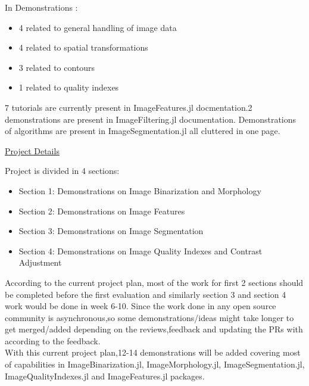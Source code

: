 In Demonstrations :
\begin{itemize}[noitemsep,topsep=0.2cm]
    \item 4 related to general handling of image data
    \item 4 related to spatial transformations
    \item 3 related to contours
    \item 1 related to quality indexes
\end{itemize}
7 tutorials are currently present in ImageFeatures.jl docmentation.2  demonstrations are present in ImageFiltering.jl documentation. Demonstrations of algorithms are present in ImageSegmentation.jl all cluttered in one page.


\vspace{0.5cm}
\Large
\underline{Project Details}

\vspace{0.5cm}
\large
Project is divided in 4 sections:
\begin{itemize}[noitemsep,topsep=0.2cm]
    \item Section 1: Demonstrations on Image Binarization and Morphology
    \item Section 2: Demonstrations on Image Features
    \item Section 3: Demonstrations on Image Segmentation
    \item Section 4: Demonstrations on Image Quality Indexes and Contrast Adjustment
\end{itemize}
According to the current project plan, most of the work for first 2 sections should be completed before the first evaluation and similarly section 3 and section 4 work would be done in week 6-10. Since the work done in any open source community is asynchronous,so some demonstrations/ideas might take longer to get merged/added depending on the reviews,feedback and updating the PRs with according to the feedback.\\
With this current project plan,12-14 demonstrations will be added covering most of capabilities in ImageBinarization.jl, ImageMorphology.jl, ImageSegmentation.jl, ImageQualityIndexes.jl and ImageFeatures.jl packages. 

